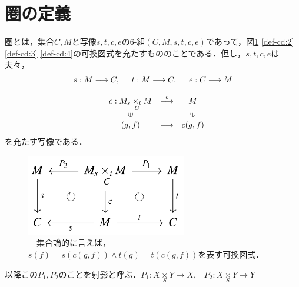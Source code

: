 \documentclass[uplatex, 12pt, a4paper, dvipdfmx]{jsarticle}
\begin{document}
\section{圏の定義}
\begin{shadebox}\begin{definition}[圏]圏とは，集合$C,M$と写像$s,t,c,e$の6-組$(C,M,s,t,c,e)$であって，図\ref{def-cd:1} \ref{def-cd:2} \ref{def-cd:3} \ref{def-cd:4}の可換図式を充たすもののことである．但し，$s,t,c,e$は夫々，\begin{eqnarray*}s:M\longrightarrow C,\hspace{5mm} t:M\longrightarrow C, \hspace{5mm} e:C\longrightarrow M\\[3mm] \left. 
\begin{array}{ccc}
    c:M_s\underset{C}{\times_t}M & \stackrel{c}{\longrightarrow} & M \\
    \rotatebox{90}{$\in$} & & \rotatebox{90}{$\in$} \\
    (g,f) & \longmapsto & c(g,f)
\end{array} \right. \hspace{10mm} \end{eqnarray*}を充たす写像である．

\vspace{1mm} \end{definition}\end{shadebox}

\begin{figure}[ht] \begin{center}  \caption{\label{def-cd:1}　集合論的に言えば，$s(f)=s(c(g,f))\wedge t(g)=t(c(g,f))$を表す可換図式．}
    \includegraphics[width=7cm]{cd-1.png}
\end{center}\end{figure}
以降この$P_1, P_2$のことを射影と呼ぶ．\hspace{6mm}$P_1: X\underset{S}{\times}Y \longrightarrow X, \; \; \; P_2: X\underset{S}{\times}Y \longrightarrow Y$
\end{document}
